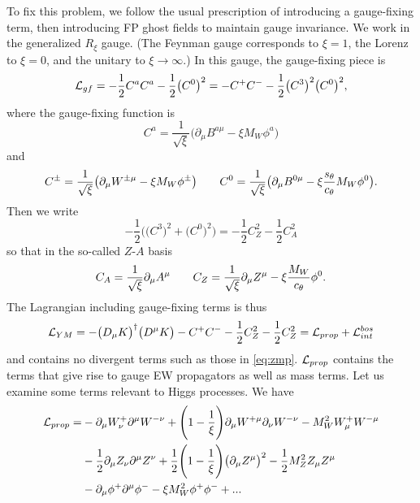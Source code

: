 To fix this problem, we follow the usual prescription of introducing a 
gauge-fixing term, then introducing FP ghost fields to maintain gauge invariance. We
work in the generalized $R_{\xi}$ gauge. (The Feynman gauge corresponds to
$\xi=1$, the Lorenz to $\xi=0$, and the unitary to $\xi\to\infty$.) In this
gauge, the gauge-fixing piece is
\begin{equation}
  \mathcal{L}_{gf}=-\frac{1}{2}C^a C^a -\frac{1}{2}\big(C^0\big)^2
            =-C^+ C^- -\frac{1}{2}\big(C^3\big)^2\big(C^0\big)^2,
\end{equation}
where the gauge-fixing function is
\begin{equation}
  C^a =\frac{1}{\sqrt{\xi}}\big(\partial_{\mu}B^{a\mu}
                -\xi M_W \phi^a \big)
\end{equation}
and
\begin{equation}
  \label{eq:cdefs}
  C^{\pm}=\frac{1}{\sqrt{\xi}}\big(\partial_{\mu}W^{\pm\mu}
                   -\xi M_W \phi^{\pm}\big) \qquad
  C^{0}=\frac{1}{\sqrt{\xi}}\big(\partial_{\mu}B^{0\mu}
                   -\xi\frac{s_{\theta}}{c_{\theta}}M_W \phi^{0}\big).
\end{equation}
Then we write
\begin{equation}
  -\frac{1}{2}\Big(\big(C^3\big)^2 +\big(C^0\big)^2\Big)
       =-\frac{1}{2}C_Z^2 -\frac{1}{2}C_A^2
\end{equation}
so that in the so-called $Z$-$A$ basis
\begin{equation}
  \label{eq:zadefs}
  C_A=\frac{1}{\sqrt{\xi}}\partial_{\mu}A^{\mu} \qquad
  C_Z=\frac{1}{\sqrt{\xi}}\partial_{\mu}Z^{\mu}-\xi\frac{M_W}{c_{\theta}}\phi^0.
\end{equation}
The Lagrangian including gauge-fixing terms is thus
\begin{equation}
  \mathcal{L}_{YM}=-\big(D_{\mu}K\big)^{\dagger}\big(D^{\mu}K\big)-C^+ C^-
               -\frac{1}{2}C_Z^2-\frac{1}{2}C_Z^2
            =\mathcal{L}_{prop}+\mathcal{L}_{int}^{bos}
\end{equation}
and contains no divergent terms such as those in \eqref{eq:zmp}. $\mathcal{L}_{prop}$
contains the terms that give rise to gauge EW propagators as well as mass
terms. Let us examine some terms relevant to Higgs processes. We have
\begin{equation}
  \begin{aligned}
  \mathcal{L}_{prop}=&-\partial_{\mu}W_{\nu}^+ \partial^{\mu}W^{-\nu}
     +\Bigg(1-\frac{1}{\xi}\Bigg)\partial_{\mu}W^{+\mu}\partial_{\nu}W^{-\nu}
     -M_W^2 W_{\mu}^+ W^{-\mu} \\
    &-\frac{1}{2}\partial_{\mu}Z_{\nu}\partial^{\mu}Z^{\nu}
     +\frac{1}{2}\Bigg(1-\frac{1}{\xi}\Bigg)\big(\partial_{\mu}Z^{\mu}\big)^2
     -\frac{1}{2}M_Z^2 Z_{\mu}Z^{\mu} \\
    &-\partial_{\mu}\phi^+ \partial^{\mu}\phi^- -\xi M_W^2\phi^+ \phi^-
     +...
  \end{aligned}
\end{equation}
